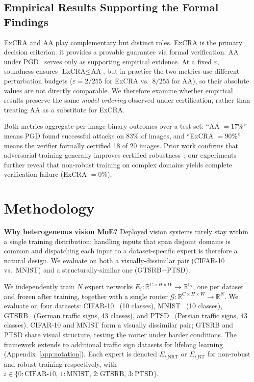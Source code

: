 \documentclass[runningheads]{llncs}
\begin{document}
\subsection{Empirical Results Supporting the Formal Findings}

ExCRA and AA play complementary but distinct roles. ExCRA is the primary decision criterion: it provides a provable guarantee via formal verification. AA under PGD~\cite{madry2018} serves only as supporting empirical evidence. At a fixed $\varepsilon$, soundness ensures $\text{ExCRA} \leq \text{AA}$, but in practice the two metrics use different perturbation budgets ($\varepsilon = 2/255$ for ExCRA vs.\ $8/255$ for AA), so their absolute values are not directly comparable. We therefore examine whether empirical results preserve the same \emph{model ordering} observed under certification, rather than treating AA as a substitute for ExCRA.

Both metrics aggregate per-image binary outcomes over a test set: ``AA $= 17\%$'' means PGD found successful attacks on 83\% of images, and ``ExCRA $= 90\%$'' means the verifier formally certified 18 of 20 images. Prior work confirms that adversarial training generally improves certified robustness~\cite{salman2019provably,balunovic2020adversarial,li2023sok}; our experiments further reveal that non-robust training on complex domains yields complete verification failure (ExCRA $= 0\%$).

\section{Methodology}

\textbf{Why heterogeneous vision MoE?} Deployed vision systems rarely stay within a single training distribution: handling inputs that span disjoint domains is common and dispatching each input to a dataset-specific expert is therefore a natural design. We evaluate on both a visually-dissimilar pair (CIFAR-10 vs.\ MNIST) and a structurally-similar one (GTSRB+PTSD).

We independently train $N$ expert networks $E_i: \mathbb{R}^{C \times H \times W} \to \mathbb{R}^{C_i}$, one per dataset and frozen after training, together with a single router $\mathcal{G}: \mathbb{R}^{C \times H \times W} \to \mathbb{R}^N$. We evaluate on four datasets: CIFAR-10~\cite{cifar10} (10 classes), MNIST~\cite{mnist1998} (10 classes), GTSRB~\cite{gtsrb} (German traffic signs, 43 classes), and PTSD~\cite{ptsd} (Persian traffic signs, 43 classes). CIFAR-10 and MNIST form a visually dissimilar pair; GTSRB and PTSD share visual structure, testing the router under harder conditions. The framework extends to additional traffic sign datasets for lifelong learning (Appendix~\ref{app:notation}). Each expert is denoted $E_{i\_\text{NRT}}$ or $E_{i\_\text{RT}}$ for non-robust and robust training respectively, with $i \in \{0{:}\text{CIFAR-10},\, 1{:}\text{MNIST},\, 2{:}\text{GTSRB},\, 3{:}\text{PTSD}\}$.
\end{document}
